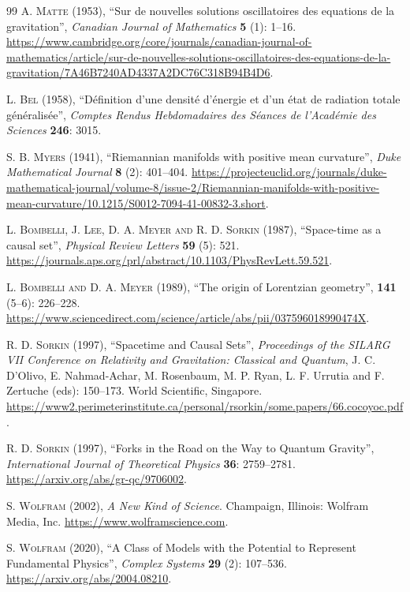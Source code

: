 \documentclass{article}
\begin{document}
\begin{thebibliography}{99}
\textsc{A. Matte} (1953), ``Sur de nouvelles solutions oscillatoires des equations de la gravitation'', \textit{Canadian Journal of Mathematics} \textbf{5} (1): 1--16. \url{https://www.cambridge.org/core/journals/canadian-journal-of-mathematics/article/sur-de-nouvelles-solutions-oscillatoires-des-equations-de-la-gravitation/7A46B7240AD4337A2DC76C318B94B4D6}.

\textsc{L. Bel} (1958), ``D\'efinition d'une densit\'e d'\'energie et d'un \'etat de radiation totale g\'en\'eralis\'ee'', \textit{Comptes Rendus Hebdomadaires des S\'eances de l'Acad\'emie des Sciences} \textbf{246}: 3015.

\textsc{S. B. Myers} (1941), ``Riemannian manifolds with positive mean curvature'', \textit{Duke Mathematical Journal} \textbf{8} (2): 401--404. \url{https://projecteuclid.org/journals/duke-mathematical-journal/volume-8/issue-2/Riemannian-manifolds-with-positive-mean-curvature/10.1215/S0012-7094-41-00832-3.short}.

\textsc{L. Bombelli, J. Lee, D. A. Meyer and R. D. Sorkin} (1987), ``Space-time as a causal set'', \textit{Physical Review Letters} \textbf{59} (5): 521. \url{https://journals.aps.org/prl/abstract/10.1103/PhysRevLett.59.521}.

\textsc{L. Bombelli and D. A. Meyer} (1989), ``The origin of Lorentzian geometry'',  \textbf{141} (5--6): 226--228. \url{https://www.sciencedirect.com/science/article/abs/pii/037596018990474X}.

\textsc{R. D. Sorkin} (1997), ``Spacetime and Causal Sets'', \textit{Proceedings of the SILARG VII Conference on Relativity and Gravitation: Classical and Quantum}, J. C. D'Olivo, E. Nahmad-Achar, M. Rosenbaum, M. P. Ryan, L. F. Urrutia and F. Zertuche (eds): 150--173. World Scientific, Singapore. \url{https://www2.perimeterinstitute.ca/personal/rsorkin/some.papers/66.cocoyoc.pdf}.

\textsc{R. D. Sorkin} (1997), ``Forks in the Road on the Way to Quantum Gravity'', \textit{International Journal of Theoretical Physics} \textbf{36}: 2759--2781. \url{https://arxiv.org/abs/gr-qc/9706002}.

\textsc{S. Wolfram} (2002), \textit{A New Kind of Science}. Champaign, Illinois: Wolfram Media, Inc. \url{https://www.wolframscience.com}.

\textsc{S. Wolfram} (2020), ``A Class of Models with the Potential to Represent Fundamental Physics'', \textit{Complex Systems} \textbf{29} (2): 107--536. \url{https://arxiv.org/abs/2004.08210}.


\end{thebibliography}
\end{document}
